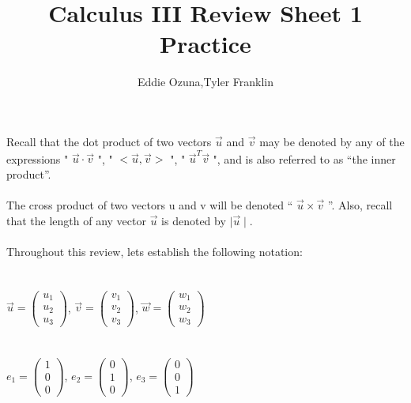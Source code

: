 \documentclass{article}
\title{Calculus III Review Sheet 1 Practice}
\author{Eddie Ozuna,Tyler Franklin}
\begin{document}
\maketitle

Recall that the dot product of two vectors $\vec{u}$ and $\vec{v}$ may be denoted by any of
the expressions " $\vec{u}\cdot \vec{v}$ ", " $<\vec{u}, \vec{v}>$ ", " $\vec{u}^T \vec{v}$ ", and is also referred to as “the inner product”.
\\
\\
The cross product of two vectors u and v will be denoted “ $\vec{u}\times\vec{v}$ ”.
Also, recall that the length of any vector $\vec{u}$ is denoted by $\mid\vec{u}\mid$.
\\
\\
Throughout this review, lets establish the following notation:\\
\\
\\
$\vec{u}=\left(\!\begin{array}{c}u_{1} \\ u_{2} \\  u_{3}\end{array} \!\right)$,
$\vec{v}=\left(\!\begin{array}{c}v_{1} \\ v_{2} \\  v_{3}\end{array} \!\right)$,
$\vec{w}=\left(\!\begin{array}{c}w_{1} \\ w_{2} \\  w_{3}\end{array} \!\right)$
\\
\\
\\
$e_{1}=\left(\!\begin{array}{c}1 \\ 0 \\  0\end{array} \!\right)$,
$e_{2}=\left(\!\begin{array}{c}0 \\ 1 \\  0\end{array} \!\right)$,
$e_{3}=\left(\!\begin{array}{c}0 \\ 0 \\  1\end{array} \!\right)$
\\
\\
\\
\end{document}
